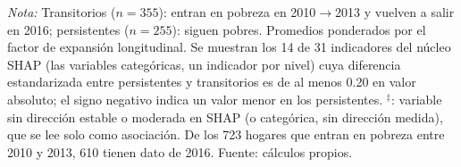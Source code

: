 \begin{table}[H]
\begin{tabular}{>{\raggedright\arraybackslash}p{5.2cm}rrrrrr}
    \bottomrule
  \end{tabular}
  \begin{minipage}{0.95\textwidth}
    \vspace{4pt}
    \footnotesize \textit{Nota:} Transitorios ($n=355$): entran en pobreza en 2010$\to$2013 y vuelven a salir en 2016; persistentes ($n=255$): siguen pobres. Promedios ponderados por el factor de expansión longitudinal. Se muestran los 14 de 31 indicadores del núcleo SHAP (las variables categóricas, un indicador por nivel) cuya diferencia estandarizada entre persistentes y transitorios es de al menos 0.20 en valor absoluto; el signo negativo indica un valor menor en los persistentes. $^{\ddagger}$: variable sin dirección estable o moderada en SHAP (o categórica, sin dirección medida), que se lee solo como asociación. De los 723 hogares que entran en pobreza entre 2010 y 2013, 610 tienen dato de 2016. Fuente: cálculos propios.
  \end{minipage}
\end{table}

